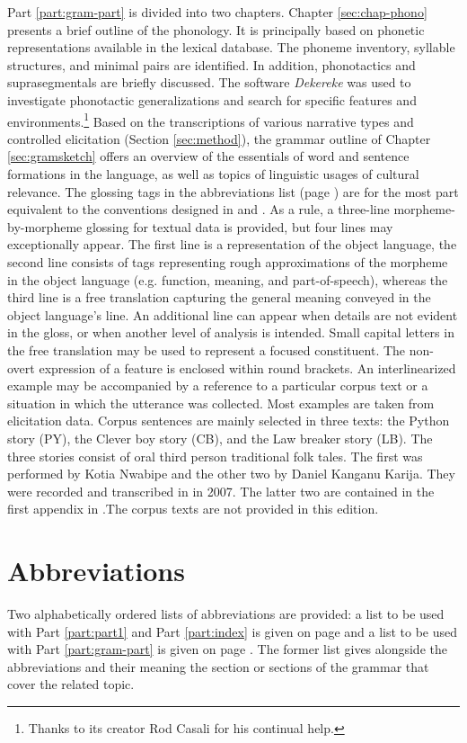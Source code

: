 Part \ref{part:gram-part} is divided into two chapters.
Chapter  \ref{sec:chap-phono}   presents  a brief outline of the phonology. It 
is principally based on phonetic representations available in the lexical database.   
The phoneme inventory,  syllable structures, and minimal pairs are identified. In 
addition, phonotactics and suprasegmentals are briefly discussed. The software 
{\it Dekereke} was used to investigate phonotactic generalizations and search 
for specific features and environments.\footnote{Thanks to its creator Rod 
Casali for his continual help.}  Based on the transcriptions of various 
narrative types and controlled elicitation (Section \ref{sec:method}), the grammar outline of Chapter 
\ref{sec:gramsketch} offers an overview of  the essentials of word and sentence 
formations in the language, as well as topics of linguistic usages of cultural 
relevance. The glossing tags in the abbreviations list (page \pageref{sec-ABB}) are for the most part 
equivalent to the conventions designed in  \citet{Comr08b} and \citet{hasp14}.  
As a rule,   a three-line morpheme-by-morpheme  glossing for textual data is 
provided, but  four lines may exceptionally appear.  The first line is a 
representation of the object language, the second line consists of   tags 
representing  rough approximations  of the morpheme in the object   language 
(e.g. function, meaning,  and part-of-speech), whereas the third line is a free  
translation capturing the general meaning  conveyed in the object language's 
line. An additional line can appear when details are not evident in the gloss, 
or when another level of analysis is intended.  Small capital letters in 
the  free translation may be used to represent a focused constituent.  The  non-overt 
expression of a feature is enclosed within round brackets. An interlinearized example  may  be accompanied by a 
reference  to a particular corpus text or  a situation in which the utterance 
was collected. Most  examples are taken from elicitation data. Corpus sentences are mainly selected in three texts: the Python story (PY), the Clever boy story (CB), and the Law breaker story (LB). The three stories consist of oral third person traditional folk tales. 
 The first was performed by Kotia Nwabipe  and the other two by Daniel Kanganu Karija.  They were recorded and transcribed in  in 2007. The latter two are contained in the first appendix in \citet[471-500]{brin11}.The corpus texts are not provided in this edition. 



\section{Abbreviations}
\label{LEX:abbrev}


 Two alphabetically ordered lists of abbreviations are provided: a list to be used with Part \ref{part:part1} and Part  \ref{part:index} is given on page \pageref{sec-AB} and a list to be used with Part \ref{part:gram-part} is given on page \pageref{sec-ABB}. The former  list gives alongside the abbreviations and their meaning the section or sections of the 
grammar that cover the related topic. 